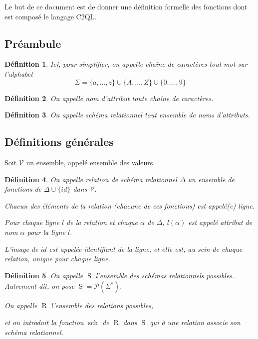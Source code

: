 \documentclass[french]{article}
\DeclareMathOperator{\R}{R}
\DeclareMathOperator{\Sc}{S}
\DeclareMathOperator{\s}{sch}
\newcommand{\val}{\mathcal{V}}
\newtheorem{defi}{Définition}
\begin{document}
Le but de ce document est de donner une définition
formelle des fonctions dont est composé le langage C2QL.

\subsection*{Préambule}
\begin{defi}
	Ici, pour simplifier, on appelle chaîne de caractères
	tout mot sur l'alphabet 
	$$
	\Sigma = \{a, \dots, z\} \cup \{A, \dots, Z \} \cup \{0, \dots,  9 \}
 	$$
\end{defi}

\begin{defi}
	On appelle \emph{nom d'attribut} toute chaîne de caractères.
\end{defi}	

\begin{defi}
	On appelle \emph{schéma relationnel} tout ensemble
	de noms d'attributs.
\end{defi}

\subsection*{Définitions générales}
Soit $\val$ un ensemble, appelé ensemble des valeurs.

\begin{defi}
	On appelle \emph{relation} de schéma relationnel $\Delta$
	un ensemble de fonctions de $\Delta \cup \{ id \}$ dans $\val$.
	
	Chacun des éléments de la relation (chacune de ces fonctions)
	est appelé(e) \emph{ligne}.
	
	Pour chaque ligne $l$ de la relation et chaque $\alpha$ de $\Delta$,
	$l(\alpha)$ est appelé \emph{attribut} de \emph{nom} $\alpha$ pour la ligne $l$.
	
	L'image de $id$ est appelée \emph{identifiant de la ligne}, et elle est, au sein de chaque
	relation, unique pour chaque ligne.
\end{defi}

\begin{defi}
	On appelle $\Sc$ l'ensemble des schémas relationnels possibles.
	Autrement dit, on pose  $\Sc = \mathcal{P}\left( \Sigma^* \right)$.
	
	On appelle $\R$ l'ensemble des relations possibles,
	
	et on introduit la fonction $\s$ de $\R$ dans
	$\Sc$
	qui à une relation associe son schéma relationnel.
\end{defi}
\end{document}
